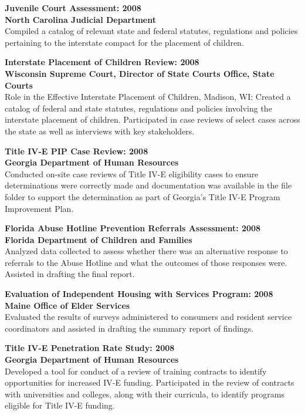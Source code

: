 \documentclass[line, mm, 10pt]{res}
\begin{document}
\begin{resume}
  {\bf Juvenile Court Assessment: 2008} \\
  {\bf North Carolina Judicial Department} \\
  Compiled a catalog of relevant state and federal statutes,
  regulations and policies pertaining to the interstate compact for
  the placement of children.

  {\bf Interstate Placement of Children Review: 2008} \\
  {\bf Wisconsin Supreme Court, Director of State Courts Office, State
    Courts} \\
  Role in the Effective Interstate Placement of Children, Madison, WI:
  Created a catalog of federal and state statutes, regulations and
  policies involving the interstate placement of children.  Participated
  in case reviews of select cases across the state as well as interviews
  with key stakeholders.

  {\bf Title IV-E PIP Case Review: 2008} \\
  {\bf Georgia Department of Human Resources} \\
  Conducted on-site case reviews of Title IV-E eligibility cases to
  ensure determinations were correctly made and documentation was
  available in the file folder to support the determination as part of
  Georgia's Title IV-E Program Improvement Plan.

  {\bf Florida Abuse Hotline Prevention Referrals Assessment: 2008} \\
  {\bf Florida Department of Children and Families} \\
  Analyzed data collected to assess whether there
  was an alternative response to referrals to the Abuse Hotline and
  what the outcomes of those responses were.  Assisted in drafting the
  final report.

  {\bf Evaluation of Independent Housing with Services Program: 2008} \\
  {\bf Maine Office of Elder Services} \\
  Evaluated the results of surveys administered to consumers and
  resident service coordinators and assisted in drafting the summary
  report of findings.

  {\bf Title IV-E Penetration Rate Study: 2008} \\
  {\bf Georgia Department of Human Resources} \\
  Developed a tool for conduct of a review of training contracts to
  identify opportunities for increased IV-E funding.  Participated in
  the review of contracts with universities and colleges, along with
  their curricula, to identify programs eligible for Title IV-E
  funding.


\end{resume}
\end{document}
